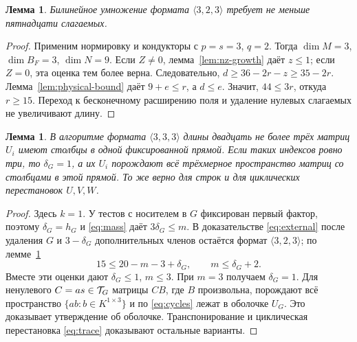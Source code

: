\documentclass[11pt,a4paper]{article}
\numberwithin{equation}{section}
\theoremstyle{plain}
\newtheorem{lemma}[theorem]{Лемма}
\theoremstyle{definition}
\newcommand{\leqs}{\leqslant}\newcommand{\geqs}{\geqslant}
\begin{document}
\begin{lemma}\label{lem:rect15}
Билинейное умножение формата $\langle3,2,3\rangle$ требует не меньше
пятнадцати слагаемых.
\end{lemma}
\begin{proof}
Применим нормировку и кондукторы с $p=s=3$, $q=2$.
Тогда $\dim M=3$, $\dim B_F=3$, $\dim N=9$.
Если $Z\ne0$, лемма~\ref{lem:nz-growth} даёт $z\leqs1$;
если $Z=0$, эта оценка тем более верна. Следовательно,
$d\geqs36-2r-z\geqs35-2r$.
Лемма~\ref{lem:physical-bound} даёт $9+e\leqs r$, а $d\leqs e$.
Значит, $44\leqs3r$, откуда $r\geqs15$.
Переход к бесконечному расширению поля и удаление нулевых слагаемых
не увеличивают длину.
\end{proof}

\begin{lemma}\label{lem:point-capacity}
В алгоритме формата $\langle3,3,3\rangle$ длины двадцать не более трёх
матриц $U_i$ имеют столбцы в одной фиксированной прямой. Если таких
индексов ровно три, то $\delta_G=1$, а их $U_i$ порождают всё
трёхмерное пространство матриц со столбцами в этой прямой.
То же верно для строк и для циклических перестановок $U,V,W$.
\end{lemma}
\begin{proof}
Здесь $k=1$. У тестов с носителем в $G$ фиксирован первый фактор, поэтому
$\delta_G=h_G$ и \eqref{eq:mass} даёт $3\delta_G\leqs m$.
В доказательстве \eqref{eq:external} после удаления $G$ и
$3-\delta_G$ дополнительных
членов остаётся формат $\langle3,2,3\rangle$; по лемме~\ref{lem:rect15}
\[
 15\leqs20-m-3+\delta_G,\qquad m\leqs\delta_G+2.
\]
Вместе эти оценки дают $\delta_G\leqs1$, $m\leqs3$.
При $m=3$ получаем $\delta_G=1$.
Для ненулевого $C=as\in\mathcal T_G$ матрицы $CB$, где $B$ произвольна,
порождают всё пространство $\{ab:b\in K^{1\times3}\}$ и по
\eqref{eq:cycles} лежат в оболочке $U_G$. Это доказывает утверждение
об оболочке.
Транспонирование и циклическая перестановка \eqref{eq:trace} доказывают
остальные варианты.
\end{proof}
\end{document}
